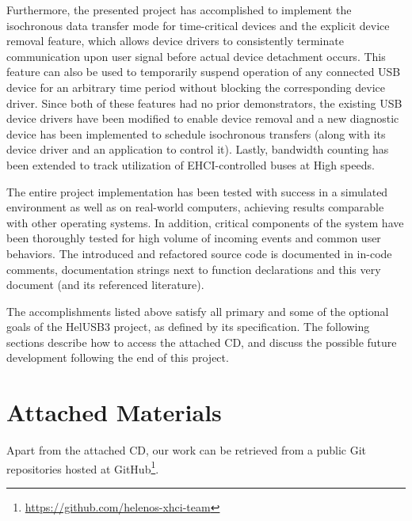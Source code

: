 Furthermore, the presented project has accomplished to implement the isochronous
data transfer mode for time-critical devices and the explicit device removal
feature, which allows device drivers to consistently terminate communication
upon user signal before actual device detachment occurs. This feature can also
be used to temporarily suspend operation of any connected USB device for an
arbitrary time period without blocking the corresponding device driver. Since
both of these features had no prior demonstrators, the existing USB device
drivers have been modified to enable device removal and a new diagnostic device
has been implemented to schedule isochronous transfers (along with its device
driver and an application to control it). Lastly, bandwidth counting has been
extended to track utilization of EHCI-controlled buses at High speeds.

The entire project implementation has been tested with success in a simulated
environment as well as on real-world computers, achieving results comparable
with other operating systems. In addition, critical components of the system
have been thoroughly tested for high volume of incoming events and common user
behaviors. The introduced and refactored source code is documented in in-code
comments, documentation strings next to function declarations and this very
document (and its referenced literature).

The accomplishments listed above satisfy all primary and some of the optional
goals of the HelUSB3 project, as defined by its specification. The following
sections describe how to access the attached CD, and discuss the possible future
development following the end of this project.


\section{Attached Materials}

Apart from the attached CD, our work can be retrieved from a public Git repositories
hosted at GitHub\footnote{\href{https://github.com/helenos-xhci-team}{https://github.com/helenos-xhci-team}}.

